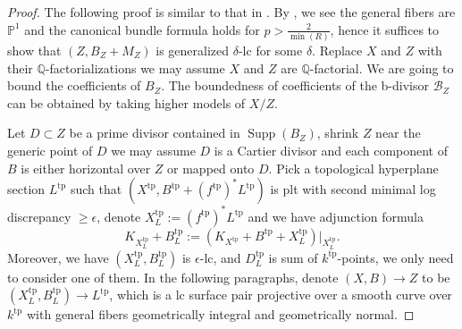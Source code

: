 \documentclass[letterpaper,reqno,12pt]{amsart}
\DeclareMathOperator{\Supp}{Supp}
\newcommand{\tp}{\mathrm{tp}}
\numberwithin{equation}{section}
\theoremstyle{plain}
\begin{document}
\begin{proof}
    The following proof is similar to that in \cite{SingbaseFanofib}. By \cite[Theorem 3.4]{complement1}, we see the general fibers are $\mathbb P^1$ and the canonical bundle formula holds for $p>\frac{2}{\min(R)}$, hence it suffices to show that $(Z,B_Z+M_Z)$ is generalized $\delta$-lc for some $\delta$. Replace $X$ and $Z$ with their $\mathbb Q$-factorializations we may assume $X$ and $Z$ are $\mathbb Q$-factorial. We are going to bound the coefficients of $B_Z$. The boundedness of coefficients of the b-divisor $\mathcal B_Z$ can be obtained by taking higher models of $X/Z$.
    
    Let $D\subset Z$ be a prime divisor contained in $\Supp(B_Z)$, shrink $Z$ near the generic point of $D$ we may assume $D$ is a Cartier divisor and each component of $B$ is either horizontal over $Z$ or mapped onto $D$. Pick a topological hyperplane section $L^\tp$ such that $(X^\tp, B^\tp+(f^\tp)^*L^\tp)$ is plt with second minimal log discrepancy $\geq \epsilon$, denote $X_L^\tp:=(f^\tp)^*L^\tp$ and we have adjunction formula 
    \[K_{X_L^\tp}+B_L^\tp:=(K_{X^\tp}+B^\tp+X_L^\tp)|_{X_L^\tp}.\]
    Moreover, we have $(X_L^\tp,B_L^\tp)$ is $\epsilon$-lc, and $D_L^\tp$ is sum of $k^\tp$-points, we only need to consider one of them. In the following paragraphs, denote $(X,B)\to Z$ to be $(X_L^\tp,B_L^\tp)\to L^\tp$, which is a lc surface pair projective over a smooth curve over $k^\tp$ with general fibers geometrically integral and geometrically normal.
    

\end{proof}
\end{document}
